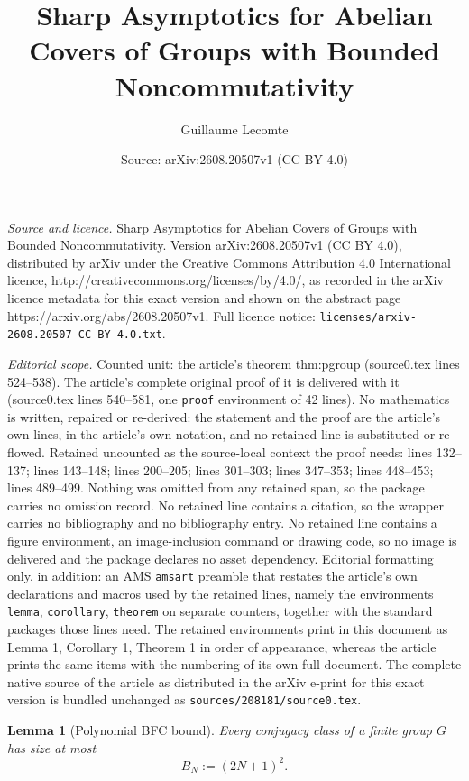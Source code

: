 \documentclass[10pt,a4paper]{amsart}
\title{Sharp Asymptotics for Abelian Covers of Groups with Bounded Noncommutativity}
\author{Guillaume Lecomte}
\date{Source: arXiv:2608.20507v1 (CC BY 4.0)}
\newtheorem{lemma}{Lemma}
\begin{document}
\maketitle

\noindent\emph{Source and licence.} Sharp Asymptotics for Abelian Covers of Groups with Bounded Noncommutativity. Version arXiv:2608.20507v1 (CC BY 4.0), distributed by arXiv under the Creative Commons Attribution 4.0 International licence, http://creativecommons.org/licenses/by/4.0/, as recorded in the arXiv licence metadata for this exact version and shown on the abstract page https://arxiv.org/abs/2608.20507v1. Full licence notice: \texttt{licenses/arxiv-2608.20507-CC-BY-4.0.txt}.\par\smallskip

\noindent\textit{Editorial scope.} Counted unit: the article's theorem thm:pgroup (source0.tex lines 524--538). The article's complete original proof of it is delivered with it (source0.tex lines 540--581, one \texttt{proof} environment of 42 lines). No mathematics is written, repaired or re-derived: the statement and the proof are the article's own lines, in the article's own notation, and no retained line is substituted or re-flowed.  Retained uncounted as the source-local context the proof needs: lines 132--137; lines 143--148; lines 200--205; lines 301--303; lines 347--353; lines 448--453; lines 489--499.  Nothing was omitted from any retained span, so the package carries no omission record.  No retained line contains a citation, so the wrapper carries no bibliography and no bibliography entry.  No retained line contains a figure environment, an image-inclusion command or drawing code, so no image is delivered and the package declares no asset dependency.  Editorial formatting only, in addition: an AMS \texttt{amsart} preamble that restates the article's own declarations and macros used by the retained lines, namely the environments \texttt{lemma}, \texttt{corollary}, \texttt{theorem} on separate counters, together with the standard packages those lines need.  The retained environments print in this document as Lemma 1, Corollary 1, Theorem 1 in order of appearance, whereas the article prints the same items with the numbering of its own full document.  The complete native source of the article as distributed in the arXiv e-print for this exact version is bundled unchanged as \texttt{sources/208181/source0.tex}.
\begin{lemma}[Polynomial BFC bound]\label{lem:bfc}
Every conjugacy class of a finite group $G$ has size at most
\[
B_N:=(2N+1)^2.
\]
\end{lemma}
\end{document}
